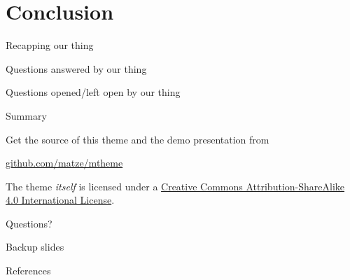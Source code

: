 \documentclass[10pt]{beamer}
\begin{document}
\section{Conclusion}
\begin{frame}{Recapping our thing}
\end{frame}
\begin{frame}{Questions answered by our thing}
\end{frame}
\begin{frame}{Questions opened/left open by our thing}
\end{frame}

\begin{frame}{Summary}

  Get the source of this theme and the demo presentation from

  \begin{center}\url{github.com/matze/mtheme}\end{center}

  The theme \emph{itself} is licensed under a
  \href{http://creativecommons.org/licenses/by-sa/4.0/}{Creative Commons
  Attribution-ShareAlike 4.0 International License}.

  \begin{center}\ccbysa\end{center}

\end{frame}

\begin{frame}[standout]
  Questions?
\end{frame}

\appendix


\begin{frame}[fragile]{Backup slides}
  \nocite{*}
%
%
\end{frame}

\begin{frame}[allowframebreaks]{References}
  \printbibliography

\end{frame}
\end{document}
